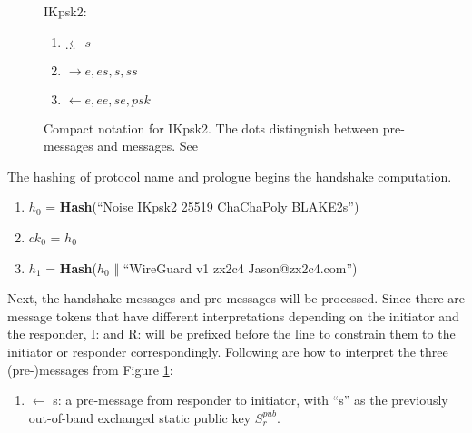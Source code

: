   \begin{figure}[h]
    \begin{center}
      \begin{varwidth}{\textwidth}
      \large IKpsk2:
      \begin{enumerate}
          \item \(\leftarrow s\) \\
          \(\dots\)
          \item \(\rightarrow e, es, s, ss\)
          \item \(\leftarrow e, ee, se, psk\)
      \end{enumerate}
      \end{varwidth}
    \end{center}
    \caption{Compact notation for IKpsk2. The dots distinguish between pre-messages and messages. See \cite[p.~36]{noise}}
    \label{fig:ikpsk}
  \end{figure}

  \setcounter{cnt}{1}
  The hashing of protocol name and prologue begins the handshake computation.
    \begin{center}
      \begin{varwidth}{\textwidth}
      \begin{enumerate} [start = \value{cnt}]
          \item $h_0$ = \textbf{Hash}(``Noise IKpsk2 25519 ChaChaPoly BLAKE2s'')
          \item $ck_0$ = $h_0$
          \item $h_1$ = \textbf{Hash}($h_0$ $\Vert$ ``WireGuard v1 zx2c4 Jason@zx2c4.com'')
          \addtocounter{cnt}{3}
      \end{enumerate}
      \end{varwidth}
    \end{center}
  
  Next, the handshake messages and pre-messages will be processed. Since there are message tokens
  that have different interpretations depending on the initiator and the responder, I: and R: will
  be prefixed before the line to constrain them to the initiator or responder correspondingly.
  Following are how to interpret the three (pre-)messages from Figure \ref{fig:ikpsk}:

  \setcounter{msg}{0}
  \begin{enumerate} [start = \value{msg}]
    \item $\leftarrow$ s: a pre-message from responder to initiator, with ``s'' as the
    previously out-of-band exchanged static public key $S^{pub}_r$.
    \addtocounter{msg}{1}
  \end{enumerate}

